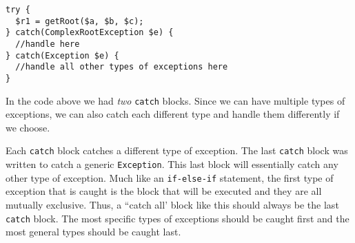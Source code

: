 \begin{verbatim}
try {
  $r1 = getRoot($a, $b, $c);
} catch(ComplexRootException $e) {
  //handle here
} catch(Exception $e) {
  //handle all other types of exceptions here
}
\end{verbatim}

In the code above we had \emph{two} \texttt{catch}
blocks.  Since we can have multiple types of exceptions, we
can also catch each different type and handle them differently
if we choose.  

Each \texttt{catch} block catches a different 
type of exception.  The last \texttt{catch} block 
was written to catch a generic \texttt{Exception}.  This last
block will essentially catch any other type of exception.  
Much like an \texttt{if-else-if} statement, the
first type of exception that is caught is the block that will
be executed and they are all mutually exclusive.  Thus, a
``catch all' block like this should always be the last 
\texttt{catch} block.  The most specific types
of exceptions should be caught first and the most general
types should be caught last.


